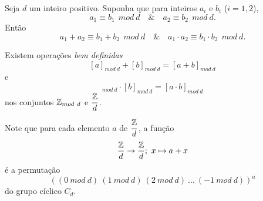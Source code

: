 \begin{stat}
  Seja $d$ um inteiro positivo. Suponha que para inteiros $a_{i}$ e $b_{i}$ ($i = 1,2$), $$a_{1} \equiv b_{1}\ \ mod\ d\quad \&\quad a_{2} \equiv b_{2}\ \ mod\ d.$$ Então $$a_{1} + a_{2} \equiv b_{1} + b_{2}\ \ mod\ d\quad \&\quad a_{1}\cdot a_{2} \equiv b_{1} \cdot b_{2}\ \ mod\ d.$$
\end{stat}
\begin{corollary}
  Existem operações \emph{bem definidas}
  \begin{equation}\label{ADITTOP}
    [a]_{mod\ d} + [b]_{mod\ d} = [a+b]_{mod\ d}
  \end{equation}
  e
  \begin{equation}
    [a]_{mod\ d} \cdot [b]_{mod\ d} = [a\cdot b]_{mod\ d}
  \end{equation}
  nos conjuntos $\mathbb{Z}_{mod\ d}$ e $\dfrac{\mathbb{Z}}{d}$.
\end{corollary}
Note que para cada elemento $a$ de $\dfrac{\mathbb{Z}}{d}$, a função $$\dfrac{\mathbb{Z}}{d} \to \dfrac{\mathbb{Z}}{d};\ x\mapsto a+x$$
é a permutação $$\left((0\ mod\ d)\ (1\ mod\ d)\ (2\ mod\ d)\ ...\ (-1\ mod\ d)\right)^{a}$$ do grupo cíclico $C_{d}$.

\newpage





